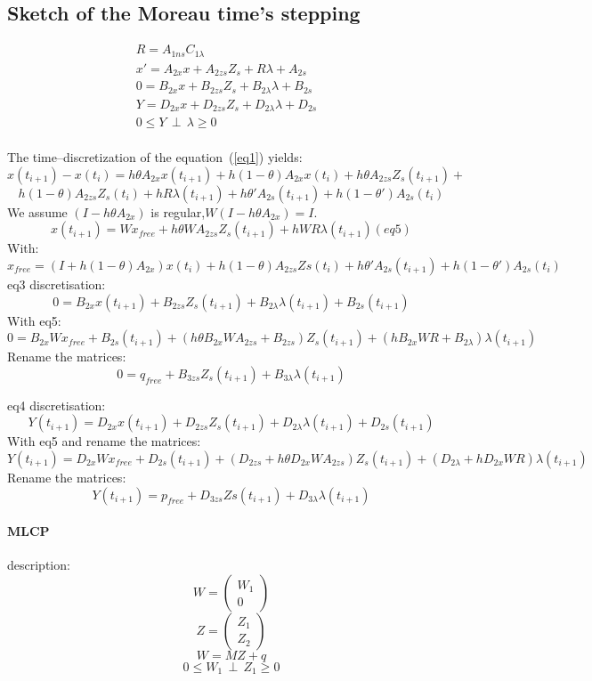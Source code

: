 \subsection{Sketch of  the Moreau time's stepping}
\begin{eqnarray}
R=A_{1ns}C_{1\lambda}\label{eq1}\\
x'=A_{2x}x +A_{2zs}Z_{s} +R \lambda +A_{2s}&\label{eq2}\\
0=B_{2x}x+B_{2zs}Z_{s} + B_{2\lambda}\lambda + B_{2s}&\label{eq3}\\
Y=D_{2x}x+D_{2zs}Z_{s}+D_{2\lambda}\lambda + D_{2s} &\label{eq4}\\
0 \leq Y \, \perp \, \lambda \geq 0&\label{eqperp}\\
\end{eqnarray}


 The time--discretization of the equation~(\ref{eq1}) yields:
\[x(t_{i+1}) - x(t_{i})=h\theta A_{2x}x(t_{i+1})+h(1-\theta)A_{2x}x(t_{i}) +h\theta
A_{2zs}Z_{s}(t_{i+1}) +\]
\[h(1-\theta)A_{2zs}Z_s(t_{i}) +hR\lambda (t_{i+1}) + h\theta 'A_{2s}(t_{i+1}) +
h(1-\theta ')A_{2s}(t_{i})\]
We assume $(I-h\theta A_{2x})$ is regular,$W(I-h\theta A_{2x}) = I.$
\[x(t_{i+1})=Wx_{free}+h\theta WA_{2zs}Z_{s}(t_{i+1})+hWR\lambda (t_{i+1})  (eq5)\]
With:
\[x_{free}=(I+h(1-\theta)A_{2x})x(t_{i}) + h(1-\theta )A_{2zs}Zs(t_{i}) + h\theta 'A_{2s}(t_{i+1}) +
h(1-\theta ')A_{2s}(t_{i})\]
eq3 discretisation:
\[0 = B_{2x}x(t_{i+1})+B_{2zs}Z_{s}(t_{i+1}) + B_{2\lambda}\lambda(t_{i+1})+B_{2s}(t_{i+1})\]
With eq5:
\[0 = B_{2x}Wx_{free}+B_{2s}(t_{i+1})+(h\theta B_{2x} WA_{2zs}+B_{2zs}) Z_{s}(t_{i+1})+(hB_{2x}WR+B_{2\lambda})\lambda(t_{i+1})\]
Rename the matrices:
\[0 = q_{free}+B_{3zs} Z_{s}(t_{i+1})+B_{3\lambda}\lambda(t_{i+1})\]

eq4 discretisation:
\[Y(t_{i+1})=D_{2x}x(t_{i+1})+D_{2zs}Z_{s}(t_{i+1}) +D_{2\lambda}\lambda(t_{i+1})+D_{2s}(t_{i+1})\]
With eq5 and rename the matrices:
\[Y(t_{i+1})=D_{2x}Wx_{free}+ D_{2s}(t_{i+1})+(D_{2zs}+h\theta
D_{2x}WA_{2zs})Z_{s}(t_{i+1})+(D_{2\lambda} + hD_{2x}WR)\lambda(t_{i+1})\]
Rename the matrices:
\[Y(t_{i+1})=p_{free}+D_{3zs}Zs(t_{i+1}) +D_{3\lambda}\lambda (t_{i+1})\]

\paragraph{MLCP}
description:\\

\[W=\left(\begin{array}{c}W_{1}\\0\end{array}\right)\]
\[Z=\left(\begin{array}{c}Z_{1}\\Z_{2}\end{array}\right)\]
\[W=MZ+q\]
\[0 \leq W_{1} \, \perp \, Z_{1} \geq 0\]
